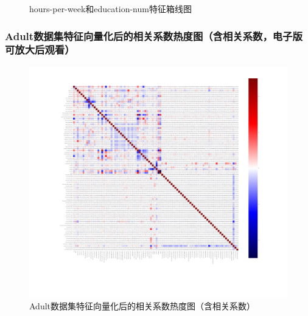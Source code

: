 \documentclass[12pt,a4paper]{article}
\theoremstyle{definition}
\begin{document}
\begin{appendix}
	\begin{figure}[H]
		\centering
		\caption{hours-per-week和education-num特征箱线图}
		\label{fig:box}
	\end{figure}
	
	\subsubsection{Adult数据集特征向量化后的相关系数热度图（含相关系数，电子版可放大后观看）}
	\label{apd:heat}
	
	\begin{figure}[H]
		\centering
		\includegraphics[width=0.85\linewidth]{img/cof_heat2_anno.png}
		\caption{Adult数据集特征向量化后的相关系数热度图（含相关系数）}
		\label{fig:heat4}
	\end{figure}
	

\end{appendix}
\end{document}
